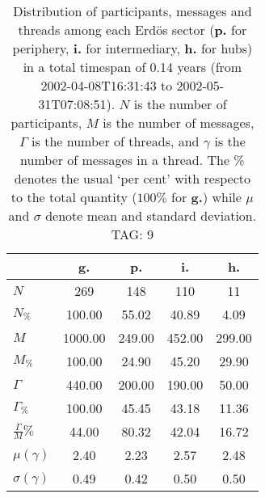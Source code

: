 \begin{table}[h!]
\begin{center}
\begin{tabular}{| l | c | c | c | c |}\hline
 & g. & p. & i. & h. \\\hline
$N$ & 269  & 148  & 110  & 11 \\\hline
$N_{\%}$ & 100.00  & 55.02  & 40.89  & 4.09 \\\hline
$M$ & 1000.00  & 249.00  & 452.00  & 299.00 \\\hline
$M_{\%}$ & 100.00  & 24.90  & 45.20  & 29.90 \\\hline
$\Gamma$ & 440.00  & 200.00  & 190.00  & 50.00 \\\hline
$\Gamma_{\%}$ & 100.00  & 45.45  & 43.18  & 11.36 \\\hline
$\frac{\Gamma}{M}\%$ & 44.00  & 80.32  & 42.04  & 16.72 \\\hline
$\mu(\gamma)$ & 2.40  & 2.23  & 2.57  & 2.48 \\\hline
$\sigma(\gamma)$ & 0.49  & 0.42  & 0.50  & 0.50 \\\hline
\end{tabular}
\caption{Distribution of participants, messages and threads among each Erd\"os sector ({\bf p.} for periphery, {\bf i.} for intermediary, 
    {\bf h.} for hubs) in a total timespan of 0.14 years (from 2002-04-08T16:31:43 to 2002-05-31T07:08:51). $N$ is the number of participants, $M$ is the number of messages, $\Gamma$ is the number of threads, and $\gamma$ is the number of messages in a thread.
    The \% denotes the usual `per cent' with respecto to the total quantity ($100\%$ for {\bf g.})
    while $\mu$ and $\sigma$ denote mean and standard deviation. TAG: 9}
\end{center}
\end{table}